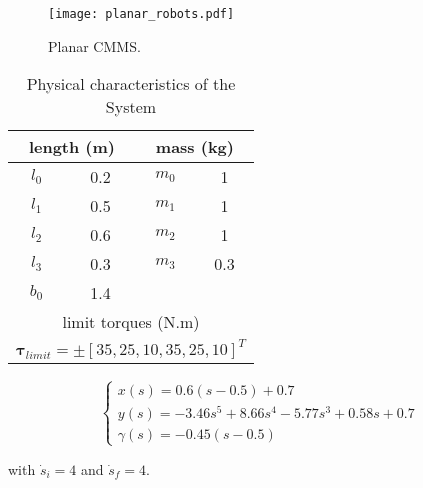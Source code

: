\documentclass{rob}%
\begin{document}
\begin{figure}[!t]
	\centering
	\texttt{[image: planar\_robots.pdf]}
	\caption{Planar CMMS.}
	\label{fig:planar_CMMS}
\end{figure}

\begin{table}[!t]
	\renewcommand{\arraystretch}{1.2}
	\caption{Physical characteristics of the System}
	\label{tab:characteristics}
	\centering
	\begin{tabular}{|c|c|c|c|}
		\hline
		\multicolumn{2}{|c|}{length (m)} & \multicolumn{2}{c|}{mass (kg)} \\ \hline
		$ l_0 $                       & 0.2                      & $ m_0 $                      & 1                       \\ \hline
		$ l_1 $                       & 0.5                      & $ m_1 $                      & 1                       \\ \hline
		$ l_2 $                       & 0.6                      & $ m_2 $                      & 1                       \\ \hline
		$ l_3 $                       & 0.3                      & $ m_3 $                      & 0.3                     \\ \hline
		$ b_0 $                       & 1.4                      &                              &                         \\ \hline \hline
		\multicolumn{4}{|c|}{limit torques (N.m)}                                               \\ \hline
		\multicolumn{4}{|c|}{$ \boldsymbol \tau_{limit} = \pm [35, 25, 10, 35, 25, 10]^T $}                                               \\ \hline
	\end{tabular}
\end{table}

\begin{equation}
\label{eq:Path1}
\begin{cases}
x(s)=0.6 (s-0.5)+0.7 \\
y(s)=-3.46 s^5+8.66 s^4-5.77 s^3+0.58 s+0.7 \\
\gamma(s)=-0.45 (s-0.5)
\end{cases}
\end{equation}

\noindent
with $ \dot s_i=4 $ and $ \dot s_f=4 $.
\end{document}
